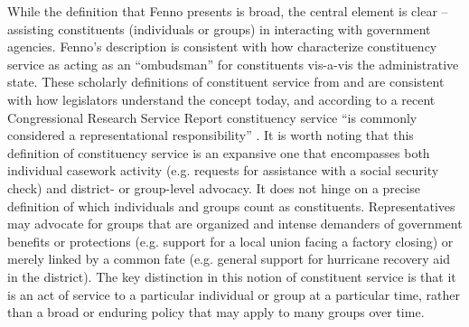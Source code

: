 \documentclass{article}
\begin{document}
While the definition that Fenno presents is broad, the central element is clear -- assisting constituents (individuals or groups) in interacting with government agencies.  Fenno's description is consistent with how \citet[pg. 2]{CainFerejohnFiorina1987} characterize constituency service as acting as an ``ombudsman'' for constituents vis-a-vis the administrative state.  These scholarly definitions of constituent service from \citep{Fenno1978} and \citet{CainFerejohnFiorina1987} are consistent with how legislators understand the concept today, and according to a recent Congressional Research Service Report constituency service ``is commonly considered a representational responsibility'' \citep{Eckman2017}.  It is worth noting that this definition of constituency service is an expansive one that encompasses both individual casework activity (e.g. requests for assistance with a social security check) and district- or group-level advocacy. It does not hinge on a precise definition of which individuals and groups count as constituents. Representatives may advocate for groups that are organized and intense demanders of government benefits or protections (e.g. support for a local union facing a factory closing) or merely linked by a common fate (e.g. general support for hurricane recovery aid in the district). The key distinction in this notion of constituent service is that it is an act of service to a particular individual or group at a particular time, rather than a broad or enduring policy that may apply to many groups over time. 



\end{document}
